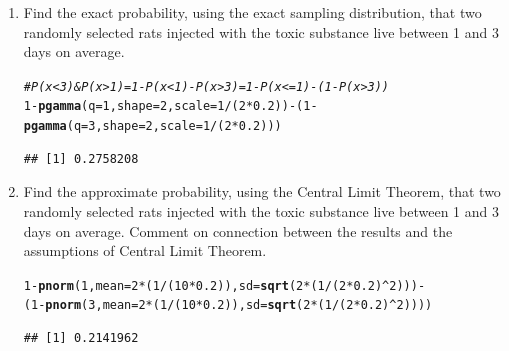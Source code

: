 \documentclass{article}\usepackage[]{graphicx}\usepackage[]{color}
\makeatletter
\newcommand{\hlnum}[1]{\textcolor[rgb]{0.686,0.059,0.569}{#1}}%
\newcommand{\hlcom}[1]{\textcolor[rgb]{0.678,0.584,0.686}{\textit{#1}}}%
\newcommand{\hlopt}[1]{\textcolor[rgb]{0,0,0}{#1}}%
\newcommand{\hlstd}[1]{\textcolor[rgb]{0.345,0.345,0.345}{#1}}%
\newcommand{\hlkwc}[1]{\textcolor[rgb]{0.333,0.667,0.333}{#1}}%
\newcommand{\hlkwd}[1]{\textcolor[rgb]{0.737,0.353,0.396}{\textbf{#1}}}%
\newenvironment{kframe}{%
 \def\at@end@of@kframe{}%
 \ifinner\ifhmode%
  \def\at@end@of@kframe{\end{minipage}}%
  \begin{minipage}{\columnwidth}%
 \fi\fi%
 \def\FrameCommand##1{\hskip\@totalleftmargin \hskip-\fboxsep
 \colorbox{shadecolor}{##1}\hskip-\fboxsep
     \hskip-\linewidth \hskip-\@totalleftmargin \hskip\columnwidth}%
 \MakeFramed {\advance\hsize-\width
   \@totalleftmargin\z@ \linewidth\hsize
   \@setminipage}}%
 {\par\unskip\endMakeFramed%
 \at@end@of@kframe}
\newenvironment{knitrout}{}{} %
\makeatother
\begin{document}
\begin{enumerate}
\begin{enumerate}
	  \item Find the exact probability, using the exact sampling distribution, that two randomly selected rats injected with the toxic substance live  between 1 and 3 days on average.
\begin{knitrout}
\color{fgcolor}\begin{kframe}
\begin{alltt}
\hlcom{# P(x < 3) & P(x > 1) = 1-P(x<1)-P(x>3) = 1-P(x<=1)-(1-P(x>3))}
\hlnum{1}\hlopt{-}\hlkwd{pgamma}\hlstd{(}\hlkwc{q}\hlstd{=}\hlnum{1}\hlstd{,} \hlkwc{shape}\hlstd{=}\hlnum{2}\hlstd{,} \hlkwc{scale}\hlstd{=}\hlnum{1}\hlopt{/}\hlstd{(}\hlnum{2}\hlopt{*}\hlnum{0.2}\hlstd{))}\hlopt{-}\hlstd{(}\hlnum{1}\hlopt{-}\hlkwd{pgamma}\hlstd{(}\hlkwc{q}\hlstd{=}\hlnum{3}\hlstd{,} \hlkwc{shape}\hlstd{=}\hlnum{2}\hlstd{,} \hlkwc{scale}\hlstd{=}\hlnum{1}\hlopt{/}\hlstd{(}\hlnum{2}\hlopt{*}\hlnum{0.2}\hlstd{)))}
\end{alltt}
\begin{verbatim}
## [1] 0.2758208
\end{verbatim}
\end{kframe}
\end{knitrout}
  \item Find the approximate probability, using the Central Limit Theorem, that two randomly 
	  selected rats injected with the toxic substance live between 1 and 3 days on average. Comment
	  on connection between the results and the assumptions of Central Limit Theorem.
\begin{knitrout}
\color{fgcolor}\begin{kframe}
\begin{alltt}
\hlnum{1}\hlopt{-}\hlkwd{pnorm}\hlstd{(}\hlnum{1}\hlstd{,} \hlkwc{mean}\hlstd{=}\hlnum{2}\hlopt{*}\hlstd{(}\hlnum{1}\hlopt{/}\hlstd{(}\hlnum{10}\hlopt{*}\hlnum{0.2}\hlstd{)),} \hlkwc{sd}\hlstd{=}\hlkwd{sqrt}\hlstd{(}\hlnum{2}\hlopt{*}\hlstd{(}\hlnum{1}\hlopt{/}\hlstd{(}\hlnum{2}\hlopt{*}\hlnum{0.2}\hlstd{)}\hlopt{^}\hlnum{2}\hlstd{)))}\hlopt{-}
  \hlstd{(}\hlnum{1}\hlopt{-}\hlkwd{pnorm}\hlstd{(}\hlnum{3}\hlstd{,} \hlkwc{mean}\hlstd{=}\hlnum{2}\hlopt{*}\hlstd{(}\hlnum{1}\hlopt{/}\hlstd{(}\hlnum{10}\hlopt{*}\hlnum{0.2}\hlstd{)),} \hlkwc{sd}\hlstd{=}\hlkwd{sqrt}\hlstd{(}\hlnum{2}\hlopt{*}\hlstd{(}\hlnum{1}\hlopt{/}\hlstd{(}\hlnum{2}\hlopt{*}\hlnum{0.2}\hlstd{)}\hlopt{^}\hlnum{2}\hlstd{))))}
\end{alltt}
\begin{verbatim}
## [1] 0.2141962

\end{verbatim}
\end{kframe}
\end{knitrout}
\end{enumerate}
\end{enumerate}
\end{document}
